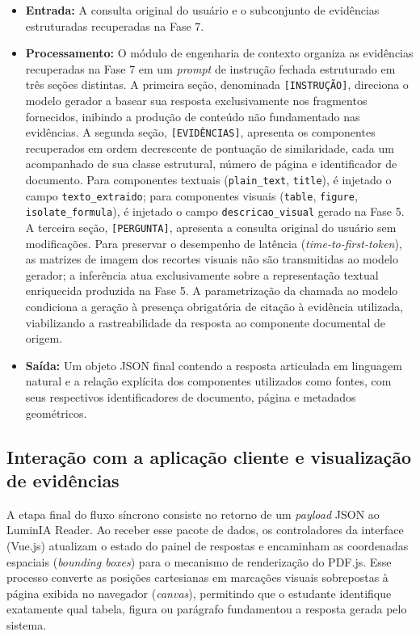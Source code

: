 \begin{itemize}
    \item \textbf{Entrada:} A consulta original do usuário e o subconjunto de evidências estruturadas recuperadas na Fase 7.
    \item \textbf{Processamento:} O módulo de engenharia de contexto organiza as evidências recuperadas na Fase 7 em um \textit{prompt} de instrução fechada estruturado em três seções distintas. A primeira seção, denominada \texttt{[INSTRUÇÃO]}, direciona o modelo gerador a basear sua resposta exclusivamente nos fragmentos fornecidos, inibindo a produção de conteúdo não fundamentado nas evidências. A segunda seção, \texttt{[EVIDÊNCIAS]}, apresenta os componentes recuperados em ordem decrescente de pontuação de similaridade, cada um acompanhado de sua classe estrutural, número de página e identificador de documento. Para componentes textuais (\texttt{plain\_text}, \texttt{title}), é injetado o campo \texttt{texto\_extraido}; para componentes visuais (\texttt{table}, \texttt{figure}, \texttt{isolate\_formula}), é injetado o campo \texttt{descricao\_visual} gerado na Fase 5. A terceira seção, \texttt{[PERGUNTA]}, apresenta a consulta original do usuário sem modificações. Para preservar o desempenho de latência (\textit{time-to-first-token}), as matrizes de imagem dos recortes visuais não são transmitidas ao modelo gerador; a inferência atua exclusivamente sobre a representação textual enriquecida produzida na Fase 5. A parametrização da chamada ao modelo condiciona a geração à presença obrigatória de citação à evidência utilizada, viabilizando a rastreabilidade da resposta ao componente documental de origem.
    \item \textbf{Saída:} Um objeto JSON final contendo a resposta articulada em linguagem natural e a relação explícita dos componentes utilizados como fontes, com seus respectivos identificadores de documento, página e metadados geométricos.
\end{itemize}

\subsection{Interação com a aplicação cliente e visualização de evidências}
\label{subsec:interacao_aplicacao_cliente}

A etapa final do fluxo síncrono consiste no retorno de um \textit{payload} JSON ao LuminIA Reader. Ao receber esse pacote de dados, os controladores da interface (Vue.js) atualizam o estado do painel de respostas e encaminham as coordenadas espaciais (\textit{bounding boxes}) para o mecanismo de renderização do PDF.js. Esse processo converte as posições cartesianas em marcações visuais sobrepostas à página exibida no navegador (\textit{canvas}), permitindo que o estudante identifique exatamente qual tabela, figura ou parágrafo fundamentou a resposta gerada pelo sistema.


